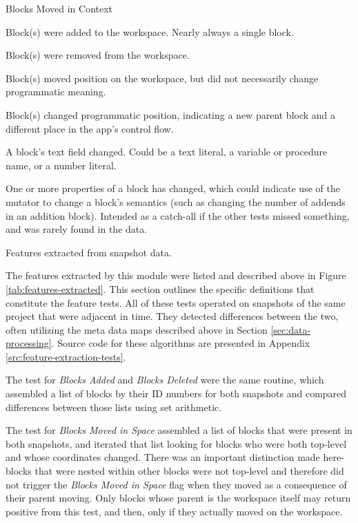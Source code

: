 \begin{table}
\begin{labeling}{Blocks Moved in Context}

	\item [Blocks Added] Block(s) were added to the workspace. Nearly always a single block.
	\item [Blocks Deleted] Block(s) were removed from the workspace.
	\item [Blocks Moved in Space] Block(s) moved position on the workspace, but did not necessarily change programmatic meaning.
	\item [Blocks Moved in Context] Block(s) changed programmatic position, indicating a new parent block and a different place in the app's control flow.
	\item [Fields Changed] A block's text field changed. Could be a text literal, a variable or procedure name, or a number literal.
	\item [Properties Modified] One or more properties of a block has changed, which could indicate use of the mutator to change a block's semantics (such as changing the number of addends in an addition block). Intended as a catch-all if the other tests missed something, and was rarely found in the data.
	
\end{labeling}
\caption[Features extracted from snapshots]{Features extracted from snapshot data.}
\label{tab:features-extracted}
\end{table}

The features extracted by this module were listed and described above in Figure \ref{tab:features-extracted}. This section outlines the specific definitions that constitute the feature tests. All of these tests operated on snapshots of the same project that were adjacent in time. They detected differences between the two, often utilizing the meta data maps described above in Section \ref{sec:data-processing}. Source code for these algorithms are presented in Appendix \ref{src:feature-extraction-tests}.

The test for \emph{Blocks Added} and \emph{Blocks Deleted} were the same routine, which assembled a list of blocks by their ID numbers for both snapshots and compared differences between those lists using set arithmetic. 

The test for \emph{Blocks Moved in Space} assembled a list of blocks that were present in both snapshots, and iterated that list looking for blocks who were both top-level and whose coordinates changed. There was an important distinction made here- blocks that were nested within other blocks were not top-level and therefore did not trigger the \emph{Blocks Moved in Space} flag when they moved as a consequence of their parent moving. Only blocks whose parent is the workspace itself may return positive from this test, and then, only if they actually moved on the workspace.


